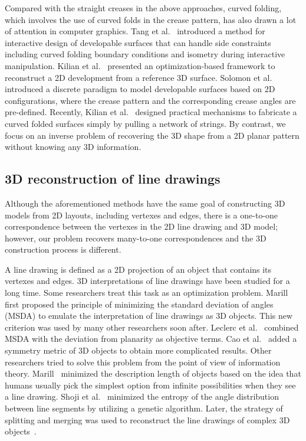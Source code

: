 
Compared with the straight creases in the above approaches, curved folding, which involves the use of curved folds in the crease pattern, has also drawn a lot of attention in computer graphics.  %
Tang et al.~\cite{Tang:2016:IDD:2882845.2832906} introduced a method for interactive design of developable surfaces that can handle side constraints including curved folding boundary conditions and isometry during interactive manipulation.
 Kilian et al.~\cite{Kilian:2008:CF:1360612.1360674} presented an optimization-based framework to reconstruct a 2D development from a reference 3D surface.
 Solomon et al.~\cite{Solomon:2012:FDS:2346796.2346817} introduced a discrete paradigm to model developable surfaces based on 2D configurations, where the crease pattern and the corresponding crease angles are pre-defined.
Recently, Kilian et al.~\cite{Kilian:2017:SAC:3087678.3015460} designed practical mechanisms to fabricate a curved folded surfaces simply by pulling a network of strings. 
%
By contrast, we focus on an inverse problem of recovering the 3D shape from a 2D planar pattern without knowing any 3D information.





\subsection{3D reconstruction of line drawings}
Although the aforementioned methods have the same goal of constructing 3D models from 2D layouts, including vertexes and edges, there is a one-to-one correspondence between the vertexes in the 2D line drawing and 3D model; however, our problem recovers many-to-one correspondences and the 3D construction process is different.

A line drawing is defined as a 2D projection of an object that contains its vertexes and edges. 3D interpretations of line drawings have been studied for a long time. 
Some researchers treat this task as an optimization problem. 
Marill~\cite{Marill:1991:EHI:113057.113061} first proposed the principle of minimizing the standard deviation of angles (MSDA) to emulate the interpretation of line drawings as 3D objects. 
%
This new criterion was used by many other researchers soon after. 
Leclerc et al.~\cite{Leclerc1992An} combined MSDA with the deviation from planarity as objective terms. 
Cao et al.~\cite{Cao:2005:ORS:1097114.1097658} added a symmetry metric of 3D objects to obtain more complicated results. 
Other researchers tried to solve this problem from the point of view of information theory.
%
Marill~\cite{Marill1992Why} minimized the description length of objects based on the idea that humans usually pick the simplest option from infinite possibilities when they see a line drawing. 
Shoji et al.~\cite{Shoji20013} minimized the entropy of the angle distribution between line segments by utilizing a genetic algorithm. 
Later, the strategy of splitting and merging was used to reconstruct the line drawings of complex 3D objects~\cite{10.1109/TPAMI.2010.49,10.1109/CVPR.2014.94}.   
		 

